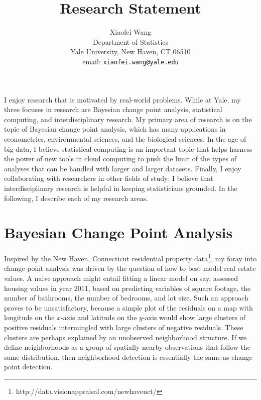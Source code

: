 \documentclass[11pt]{article}
\begin{document}
\title{Research Statement}
\author{Xiaofei Wang\\
Department of Statistics \\ 
Yale University, New Haven, CT 06510  \\ 
email: \texttt{xiaofei.wang@yale.edu} }

\maketitle
I enjoy research that is motivated by real-world problems. While at Yale, my three focuses in research are Bayesian change point analysis, statistical computing, and interdisciplinary research. My primary area of research is on the topic of Bayesian change point analysis, which has many applications in econometrics, environmental sciences, and the biological sciences. In the age of big data, I believe statistical computing is an important topic that helps harness the power of new tools in cloud computing to push the limit of the types of analyses that can be handled with larger and larger datasets. Finally, I enjoy collaborating with researchers in other fields of study; I believe that interdisciplinary research is helpful in keeping statisticians grounded. In the following, I describe each of my research areas.

\section{Bayesian Change Point Analysis} %
\label{sec:bayesian_change_point_analysis}
 Inspired by the New Haven, Connecticut residential property data\footnote{http://data.visionappraisal.com/newhavenct/}, my foray into change point analysis was driven by the question of how to best model real estate values. A naive approach might entail fitting a linear model on say, assessed housing values in year 2011, based on predicting variables of square footage, the number of bathrooms, the number of bedrooms, and lot size. Such an approach proves to be unsatisfactory, because a simple plot of the residuals on a map with longitude on the $x$-axis and latitude on the $y$-axis would show large clusters of positive residuals intermingled with large clusters of negative residuals. These clusters are perhaps explained by an unobserved neighborhood structure. If we define neighborhoods as a group of spatially-nearby observations that follow the same distribution, then neighborhood detection is essentially the same as change point detection. 
\end{document}
